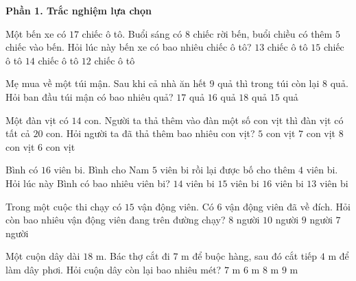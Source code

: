 \textbf{Phần 1. Trắc nghiệm lựa chọn}

\begin{ex} %
Một bến xe có $17$ chiếc ô tô. Buổi sáng có $8$ chiếc rời bến, buổi chiều có thêm $5$ chiếc vào bến. Hỏi lúc này bến xe có bao nhiêu chiếc ô tô?
\choice
{$13$ chiếc ô tô}
{$15$ chiếc ô tô}
{\True $14$ chiếc ô tô}
{$12$ chiếc ô tô}
\end{ex}

\begin{ex} %
Mẹ mua về một túi mận. Sau khi cả nhà ăn hết $9$ quả thì trong túi còn lại $8$ quả. Hỏi ban đầu túi mận có bao nhiêu quả?
\choice
{\True $17$ quả}
{$16$ quả}
{$18$ quả}
{$15$ quả}
\end{ex}

\begin{ex} %
Một đàn vịt có $14$ con. Người ta thả thêm vào đàn một số con vịt thì đàn vịt có tất cả $20$ con. Hỏi người ta đã thả thêm bao nhiêu con vịt?
\choice
{$5$ con vịt}
{$7$ con vịt}
{$8$ con vịt}
{\True $6$ con vịt}
\end{ex}

\begin{ex} %
Bình có $16$ viên bi. Bình cho Nam $5$ viên bi rồi lại được bố cho thêm $4$ viên bi. Hỏi lúc này Bình có bao nhiêu viên bi?
\choice
{$14$ viên bi}
{\True $15$ viên bi}
{$16$ viên bi}
{$13$ viên bi}
\end{ex}

\begin{ex} %
Trong một cuộc thi chạy có $15$ vận động viên. Có $6$ vận động viên đã về đích. Hỏi còn bao nhiêu vận động viên đang trên đường chạy?
\choice
{$8$ người}
{$10$ người}
{\True $9$ người}
{$7$ người}
\end{ex}

\begin{ex} %
Một cuộn dây dài $18\text{ m}$. Bác thợ cắt đi $7\text{ m}$ để buộc hàng, sau đó cắt tiếp $4\text{ m}$ để làm dây phơi. Hỏi cuộn dây còn lại bao nhiêu mét?
\choice
{\True $7\text{ m}$}
{$6\text{ m}$}
{$8\text{ m}$}
{$9\text{ m}$}
\end{ex}

